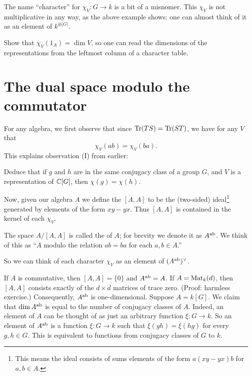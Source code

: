 \begin{abuse}
	The name ``character'' for $\chi_V : G \to k$ is a bit of a misnomer.
	This $\chi_V$ is not multiplicative in any way,
	as the above example shows: one can almost think of it as
	an element of $k^{\oplus |G|}$.
\end{abuse}

\begin{ques}
	Show that $\chi_V(1_A) = \dim V$,
	so one can read the dimensions of the representations
	from the leftmost column of a character table.
\end{ques}

\section{The dual space modulo the commutator}
For any algebra, we first observe that since $\operatorname{Tr}(TS) = \operatorname{Tr}(ST)$,
we have for any $V$ that
\[ \chi_V(ab) = \chi_V(ba). \]
This explains observation (I) from earlier:
\begin{ques}
	Deduce that if $g$ and $h$ are in the same conjugacy class of a
	group $G$, and $V$ is a representation of $\mathbb C[G]$,
	then $\chi(g) = \chi(h)$.
\end{ques}
Now, given our algebra $A$ we define the  $[A,A]$
to be the (two-sided) ideal\footnote{%
	This means the ideal consists of sums elements of the form
	$a(xy-yx)b$ for $a,b \in A$.
}
generated by elements of the form $xy-yx$.
Thus $[A,A]$ is contained in the kernel of each $\chi_V$.
\begin{definition}
	The space $A / [A,A]$ is called the  of $A$;
	for brevity we denote it as $A^\text{ab}$.
	We think of this as ``$A$ modulo the relation $ab=ba$ for each $a,b \in A$.''
\end{definition}
So we can think of each character $\chi_V$ as an element of $(A^\text{ab})^\vee$.

\begin{example}
	\listhack
	\begin{enumerate}[(a)]
		\ii If $A$ is commutative, then $[A,A] = \{0\}$
		and $A^\text{ab} = A$.
		\ii If $A = \mathrm{Mat}_k(d)$, then $[A,A]$ consists exactly
		of the $d \times d$ matrices of trace zero.
		(Proof: harmless exercise.)
		Consequently, $A^\text{ab}$ is one-dimensional.
		\ii Suppose $A = k[G]$.  We claim that $\dim A^\text{ab}$ is equal to the
		number of conjugacy classes of $A$.
		Indeed, an element of $A$ can be thought of as just
		an arbitrary function $\xi : G \to k$.
		So an element of $A^\text{ab}$ is a function $\xi: G \to k$ such that
		$\xi(gh) = \xi(hg)$ for every $g,h \in G$.
		This is equivalent to functions from conjugacy classes of $G$ to $k$.
	\end{enumerate}
\end{example}


